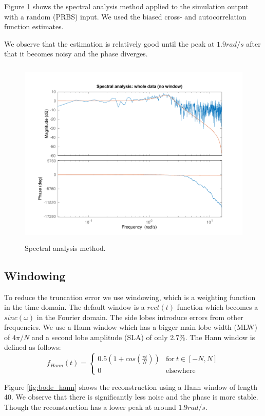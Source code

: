 \documentclass[a4paper,11pt]{article}
\begin{document}
Figure \ref{fig:bode_no_window} shows the spectral analysis method applied to the simulation output with a random (PRBS) input. We used the biased cross- and autocorrelation function estimates.

We observe that the estimation is relatively good until the peak at $1.9 rad/s$ after that it becomes noisy and the phase diverges.

\begin{figure}[H]
	\centering
    \includegraphics[height=9cm]{images/ce2_2_no_window}
    \caption{Spectral analysis method.}
    \label{fig:bode_no_window}
\end{figure}

\subsection*{Windowing}
To reduce the truncation error we use windowing, which is a weighting function in the time domain. The default window is a $rect(t)$ function which becomes a $sinc(\omega)$ in the Fourier domain. The side lobes introduce errors from other frequencies. We use a Hann window which has a bigger main lobe width (MLW) of $4\pi/N$ and a second lobe amplitude (SLA) of only 2.7\%.
The Hann window is defined as follows:
\begin{equation*}
f_{Hann}(t) =
\begin{cases}
0.5(1+cos(\frac{\pi t}{N})) & \text{for}\ t \in [-N,N] \\
0 & \text{elsewhere}
\end{cases}
\end{equation*}

Figure \ref{fig:bode_hann} shows the reconstruction using a Hann window of length 40. We observe that there is significantly less noise and the phase is more stable. Though the reconstruction has a lower peak at around $1.9rad/s$.
\end{document}
